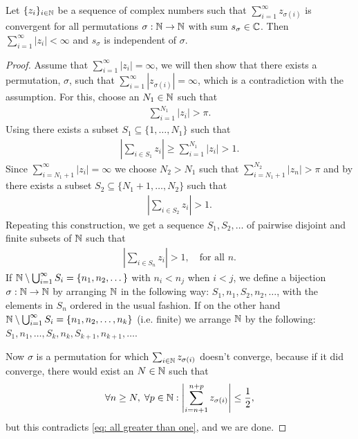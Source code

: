 \begin{proposition}\label{prop: unconditionally implies absolutely}
Let $\{z_{i}\}_{i\in \mathbb{N}}$ be a sequence of complex numbers such that $\sum_{i=1}^{\infty}z_{\sigma(i)}$ is convergent for all permutations $\sigma:\mathbb{N} \to \mathbb{N}$ with sum $s_{\sigma}\in \mathbb{C}$. Then $\sum_{i=1}^{\infty}|z_{i}|<\infty$ and $s_{\sigma}$ is independent of $\sigma$.
\end{proposition}
\begin{proof}
Assume that $\sum_{i=1}^{\infty}|z_{i}|=\infty$, we will then show that there exists a permutation, $\sigma$, such that $\sum_{i=1}^{\infty}|z_{\sigma(i)}|=\infty$, which is a contradiction with the assumption. For this, choose an $N_{1}\in \mathbb{N}$ such that
\begin{align*}
	\sum_{i=1}^{N_{1}}|z_{i}| > \pi.
\end{align*}
Using  there exists a subset $S_{1}\subseteq \{1, \dots, N_{1}\}$ such that
\begin{align*}
	\left|\sum_{i\in S_{1}}z_{i}\right| \ge \sum_{i=1}^{N_{1}}|z_{i}| > 1.
\end{align*}
Since $\sum_{i=N_{1}+1}^{\infty}|z_{i}|=\infty$ we choose $N_{2}>N_{1}$ such that $\sum_{i=N_{1}+1}^{N_{2}}|z_{n}|>\pi$ and by  there exists a subset $S_{2}\subseteq \{N_{1}+1, \dots, N_{2}\}$ such that
\begin{align*}
	\left|\sum_{i\in S_{2}} z_{i} \right| > 1.
\end{align*}
Repeating this construction, we get a sequence $S_{1}, S_{2}, \dots $ of pairwise disjoint and finite subsets of $\mathbb{N}$ such that
\begin{align}
	\left| \sum_{i\in S_{n}}z_{i}\right| > 1, \quad \text{for all } n. \label{eq: all greater than one}
\end{align}
If $\mathbb{N}\setminus \bigcup_{i=1}^{\infty}S_{i}=\{n_{1}, n_{2}, \dots \}$ with $n_{i}<n_{j}$ when $i<j$, we define a bijection $\sigma:\mathbb{N} \to \mathbb{N}$ by arranging $\mathbb{N}$ in the following way: $S_{1},n_{1}, S_{2},n_{2}, \dots$, with the elements in $S_{n}$ ordered in the usual fashion. If on the other hand $\mathbb{N}\setminus \bigcup_{i=1}^{\infty}S_{i}=\{n_{1}, n_{2}, \dots, n_{k} \}$ (i.e. finite) we arrange $\mathbb{N}$ by the following: $S_{1},n_{1}, \dots, S_{k},n_{k},S_{k+1},n_{k+1}, \dots$.

Now $\sigma$ is a permutation for which $\sum_{i\in \mathbb{N}} z_{\sigma(i)}$ doesn't converge, because if it did converge, there would exist an $N\in \mathbb{N}$ such that
\begin{align*}
	\forall n\ge N, \; \forall p\in \mathbb{N}: \left| \sum_{i=n+1}^{n+p} z_{\sigma(i)} \right| \le \frac{1}{2},
\end{align*}
but this contradicts \eqref{eq: all greater than one}, and we are done.
\end{proof}


